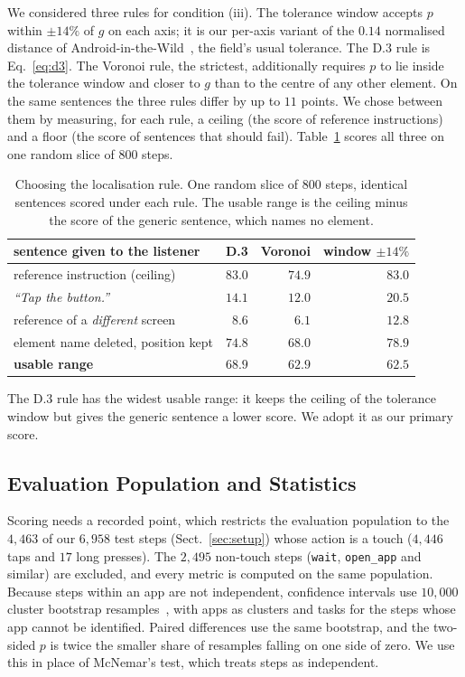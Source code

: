 \documentclass[runningheads,a4paper]{llncs}
\begin{document}
We considered three rules for condition (iii). The tolerance window accepts $p$ within $\pm14\%$ of $g$ on each axis; it is our per-axis variant of the $0.14$ normalised distance of Android-in-the-Wild~\cite{aitw}, the field's usual tolerance. The D.3 rule is Eq.~\eqref{eq:d3}. The Voronoi rule, the strictest, additionally requires $p$ to lie inside the tolerance window and closer to $g$ than to the centre of any other element. On the same sentences the three rules differ by up to $11$ points. We chose between them by measuring, for each rule, a ceiling (the score of reference instructions) and a floor (the score of sentences that should fail).
Table~\ref{tab:rules} scores all three on one random slice of $800$ steps.

\begin{table}[t]
\centering
\caption{Choosing the localisation rule. One random slice of $800$ steps, identical sentences
scored under each rule. The usable range is the ceiling minus the score of the generic sentence, which names no element.}
\label{tab:rules}
\begin{tabular}{lrrr}
\toprule
sentence given to the listener & D.3 & Voronoi & window $\pm14\%$\\
\midrule
reference instruction (ceiling) & $83.0$ & $74.9$ & $83.0$\\
\midrule
\emph{``Tap the button.''} & $14.1$ & $12.0$ & $20.5$\\
reference of a \emph{different} screen & $8.6$ & $6.1$ & $12.8$\\
element name deleted, position kept & $74.8$ & $68.0$ & $78.9$\\
\midrule
\textbf{usable range} & $\mathbf{68.9}$ & $62.9$ & $62.5$\\
\bottomrule
\end{tabular}
\end{table}

The D.3 rule has the widest usable range: it keeps the ceiling of the tolerance window but gives
the generic sentence a lower score. We adopt it as our primary score.


\subsection{Evaluation Population and Statistics}
\label{sec:population}


Scoring needs a recorded point, which restricts the evaluation population to the $4{,}463$ of our $6{,}958$ test steps (Sect.~\ref{sec:setup}) whose action is a touch ($4{,}446$ taps and $17$ long presses). The $2{,}495$ non-touch steps
(\texttt{wait}, \texttt{open\_app} and similar) are excluded, and every metric is computed on the same population.
Because steps within an app are not independent, confidence intervals use $10{,}000$ cluster bootstrap resamples~\cite{cameron2008}, with apps as clusters and tasks for the steps whose app cannot be
identified. Paired differences use the same bootstrap, and the two-sided $p$ is twice the smaller share of resamples falling on one side of zero. We use this in place of McNemar's test, which treats steps as
independent.
\end{document}
